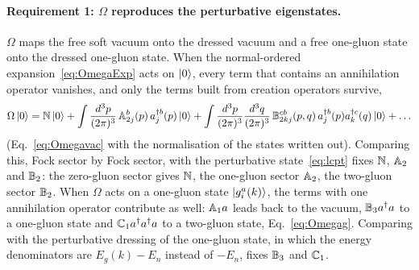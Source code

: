 \paragraph{Requirement 1: $\Omega$ reproduces the perturbative eigenstates.} $\Omega$ maps the free soft vacuum onto the dressed vacuum and a free one-gluon state onto the dressed one-gluon state. When the normal-ordered expansion~\eqref{eq:OmegaExp} acts on $\ket0$, every term that contains an annihilation operator vanishes, and only the terms built from creation operators survive,
\begin{align}\label{eq:OmegaVacShort}
\Omega\ket0=\mathbb{N}\ket0+\int\frac{d^3p}{(2\pi)^3}\,\mathbb{A}^b_{2j}(p)\,a^{\dagger b}_j(p)\ket0+\int\frac{d^3p}{(2\pi)^3}\frac{d^3q}{(2\pi)^3}\,\mathbb{B}^{cb}_{2kj}(p,q)\,a^{\dagger b}_j(p)a^{\dagger c}_k(q)\ket0+\dots
\end{align}
(Eq.~\eqref{eq:Omegavac} with the normalisation of the states written out). Comparing this, Fock sector by Fock sector, with the perturbative state~\eqref{eq:lcpt} fixes $\mathbb{N}$, $\mathbb{A}_2$ and $\mathbb{B}_2$: the zero-gluon sector gives $\mathbb{N}$, the one-gluon sector $\mathbb{A}_2$, the two-gluon sector $\mathbb{B}_2$. When $\Omega$ acts on a one-gluon state $\ket{g^a_i(k)}$, the terms with one annihilation operator contribute as well: $\mathbb{A}_1a$ leads back to the vacuum, $\mathbb{B}_3a^\dagger a$ to a one-gluon state and $\mathbb{C}_1a^\dagger a^\dagger a$ to a two-gluon state, Eq.~\eqref{eq:Omegag}. Comparing with the perturbative dressing of the one-gluon state, in which the energy denominators are $E_g(k)-E_n$ instead of $-E_n$, fixes $\mathbb{B}_3$ and $\mathbb{C}_1$.

